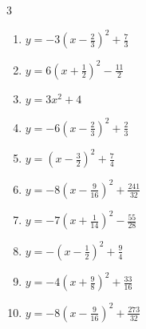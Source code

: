 \begin{multicols}{3}
\begin{enumerate}
  \item $\displaystyle y=-3\left( x-\frac{2}{3}\right)^{2}+\frac{7}{3}$


  \item $\displaystyle y=6\left( x+\frac{1}{2}\right)^{2}-\frac{11}{2}$


\columnbreak %

  \item $\displaystyle y=3x^{2}+4$

        \phantom{$\displaystyle 頂点\left( 0 , 4 \right)$}

  \item $\displaystyle y=-6\left( x-\frac{2}{3}\right)^{2}+\frac{2}{3}$


  \item $\displaystyle y=\left( x-\frac{3}{2}\right)^{2}+\frac{7}{4}$


  \item $\displaystyle y=-8\left( x-\frac{9}{16}\right)^{2}+\frac{241}{32}$


  \item $\displaystyle y=-7\left( x+\frac{1}{14}\right)^{2}-\frac{55}{28}$


  \item $\displaystyle y=-\left( x-\frac{1}{2}\right)^{2}+\frac{9}{4}$


  \item $\displaystyle y=-4\left( x+\frac{9}{8}\right)^{2}+\frac{33}{16}$


  \item $\displaystyle y=-8\left( x-\frac{9}{16}\right)^{2}+\frac{273}{32}$


\end{enumerate}
\end{multicols}
